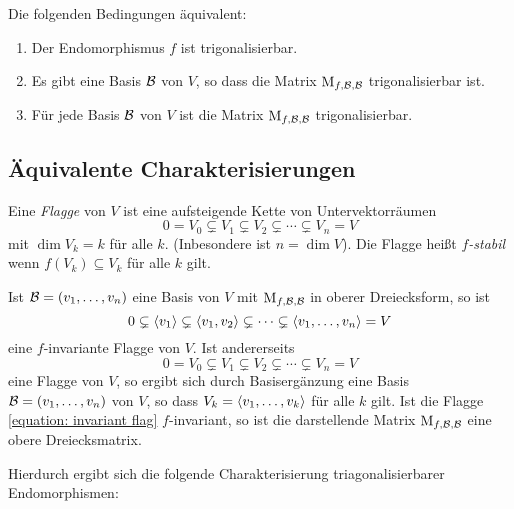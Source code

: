 \begin{lemma}
  Die folgenden Bedingungen äquivalent:
  \begin{enumerate}
    \item
      Der Endomorphismus $f$ ist trigonalisierbar.
    \item
      Es gibt eine Basis $\mathcal{B}$ von $V$, so dass die Matrix $\operatorname{M}_{f, \mathcal{B}, \mathcal{B}}$ trigonalisierbar ist.
    \item
      Für jede Basis $\mathcal{B}$ von $V$ ist die Matrix $\operatorname{M}_{f, \mathcal{B}, \mathcal{B}}$ trigonalisierbar.
  \end{enumerate}
\end{lemma}



\subsection{Äquivalente Charakterisierungen}

\begin{definition}
  Eine \emph{Flagge} von $V$ ist eine aufsteigende Kette von Untervektorräumen
  \[
                0
    =           V_0
    \subsetneq  V_1
    \subsetneq  V_2
    \subsetneq  \dotsb
    \subsetneq  V_n
    =           V
  \]
  mit $\dim V_k = k$ für alle $k$.
  \textup(Inbesondere ist $n = \dim V$\textup).
  Die Flagge heißt \emph{$f$-stabil} wenn $f(V_k) \subseteq V_k$ für alle $k$ gilt.
\end{definition}

Ist $\mathcal{B} = (v_1, \dotsc, v_n)$ eine Basis von $V$ mit $\operatorname{M}_{f, \mathcal{B}, \mathcal{B}}$ in oberer Dreiecksform, so ist
\[
              0
  \subsetneq  \left\langle v_1 \right\rangle
  \subsetneq  \left\langle v_1, v_2 \right\rangle
  \subsetneq  \dotsb
  \subsetneq  \left\langle v_1, \dotsc, v_n \right\rangle
  =           V
\]
eine $f$-invariante Flagge von $V$.
Ist andererseits
\begin{equation}
  \label{equation: invariant flag}
              0
  =           V_0
  \subsetneq  V_1
  \subsetneq  V_2
  \subsetneq  \dotsb
  \subsetneq  V_n
  =           V
\end{equation}
eine Flagge von $V$, so ergibt sich durch Basisergänzung eine Basis $\mathcal{B} = (v_1, \dotsc, v_n)$ von $V$, so dass $V_k = \left\langle v_1, \dotsc, v_k \right\rangle$ für alle $k$ gilt.
Ist die Flagge \eqref{equation: invariant flag} $f$-invariant, so ist die darstellende Matrix $\operatorname{M}_{f, \mathcal{B}, \mathcal{B}}$ eine obere Dreiecksmatrix.

Hierdurch ergibt sich die folgende Charakterisierung triagonalisierbarer Endomorphismen:

